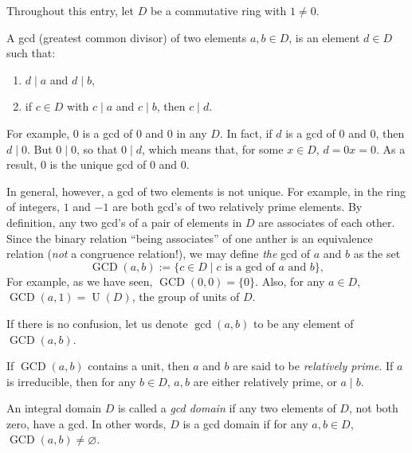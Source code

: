 \documentclass[12pt]{article}
\begin{document}
Throughout this entry, let $D$ be a commutative ring with $1\neq 0$.  

A gcd (greatest common divisor) of two elements $a, b \in D$, is an element $d \in D$ such that: 
\begin{enumerate}
\item
$d\mid a$ and $d\mid b$,
\item
if $c\in D$ with $c\mid a$ and $c\mid b$, then $c\mid d$.
\end{enumerate}

For example, $0$ is a gcd of $0$ and $0$ in any $D$.  In fact, if $d$ is a gcd of $0$ and $0$, then $d \mid 0$.  But $0\mid 0$, so that $0 \mid d$, which means that, for some $x\in D$, $d=0x=0$.  As a result, $0$ is the unique gcd of $0$ and $0$.

In general, however, a gcd of two elements is not unique.  For example, in the ring of integers, $1$ and $-1$ are both gcd's of two relatively prime elements.  By definition, any two gcd's of a pair of elements in $D$ are associates of each other.  Since the binary relation ``being associates'' of one anther is an equivalence relation (\emph{not} a congruence relation!), we may define \emph{the} gcd of $a$ and $b$ as the set 
$$\operatorname{GCD}(a,b):=\lbrace c\in D\mid c\mbox{ is a gcd of }a\mbox{ and }b\rbrace,$$
For example, as we have seen, $\operatorname{GCD}(0,0)=\lbrace 0\rbrace$.  Also, for any $a\in D$, $\operatorname{GCD}(a,1)=\operatorname{U}(D)$, the group of units of $D$.

If there is no confusion, let us denote $\gcd(a,b)$ to be any element of $\operatorname{GCD}(a,b)$.

If $\operatorname{GCD}(a,b)$ contains a unit, then $a$ and $b$ are said to be \emph{relatively prime}.  If $a$ is irreducible, then for any $b\in D$, $a,b$ are either relatively prime, or $a\mid b$.

An integral domain $D$ is called a \emph{gcd domain} if any two elements of $D$, not both zero, have a gcd.  In other words, $D$ is a gcd domain if for any $a,b\in D$, $\operatorname{GCD}(a,b)\ne \varnothing$.
\end{document}
